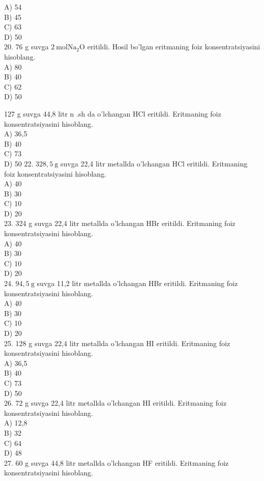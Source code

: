 A) 54\\
B) 45\\
C) 63\\
D) 50\\
20. 76 g suvga $2 \mathrm{~mol} \mathrm{Na}_{2} \mathrm{O}$ eritildi. Hosil bo'lgan eritmaning foiz konsentratsiyasini hisoblang.\\
A) 80\\
B) 40\\
C) 62\\
D) 50
  \item 127 g suvga 44,8 litr n .sh da o'lchangan HCl eritildi. Eritmaning foiz konsentratsiyasini hisoblang.\\
A) 36,5\\
B) 40\\
C) 73\\
D) 50
22. $328,5 \mathrm{~g}$ suvga 22,4 litr metallda o'lchangan HCl eritildi. Eritmaning foiz konsentratsiyasini hisoblang.\\
A) 40\\
B) 30\\
C) 10\\
D) 20\\
23. 324 g suvga 22,4 litr metallda o'lchangan HBr eritildi. Eritmaning foiz konsentratsiyasini hisoblang.\\
A) 40\\
B) 30\\
C) 10\\
D) 20\\
24. $94,5 \mathrm{~g}$ suvga 11,2 litr metallda o'lchangan HBr eritildi. Eritmaning foiz konsentratsiyasini hisoblang.\\
A) 40\\
B) 30\\
C) 10\\
D) 20\\
25. 128 g suvga 22,4 litr metallda o'lchangan HI eritildi. Eritmaning foiz konsentratsiyasini hisoblang.\\
A) 36,5\\
B) 40\\
C) 73\\
D) 50\\
26. 72 g suvga 22,4 litr metallda o'lchangan HI eritildi. Eritmaning foiz konsentratsiyasini hisoblang.\\
A) 12,8\\
B) 32\\
C) 64\\
D) 48\\
27. 60 g suvga 44,8 litr metallda o'lchangan HF eritildi. Eritmaning foiz konsentratsiyasini hisoblang.\\

